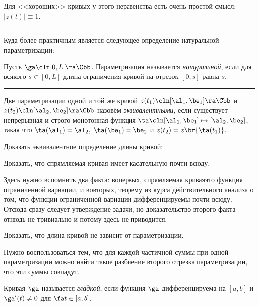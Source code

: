 \documentclass[a4paper]{article}
\newenvironment{petit}
{\par \smallskip \hrule \smallskip \footnotesize}
{\par \smallskip \hrule \smallskip}
\begin{document}
Для <<хороших>> кривых у этого неравенства есть очень простой смысл: $|\dot z(t)|\equiv 1$.

\begin{petit}
Куда более практичным является следующее определение натуральной параметризации:

\begin{df}
Пусть $\ga\cln [0,L] \ra \Cbb$. Параметризация называется \emph{натуральной}, если для всякого $s \in [0,L]$
длина ограничения кривой на отрезок $[0,s]$ равна $s$.
\end{df}
\end{petit}


\begin{df}
Две параметризации одной и той же кривой $z(t_1)\cln[\al_1,\be_1]\ra \Cbb$ и $z(t_2)\cln[\al_2,\be_2]\ra \Cbb$
назовём \emph{эквивалентными}, если существует непрерывная и строго монотонная
функция $\ta\cln [\al_1,\be_1]\mapsto [\al_2,\be_2]$, такая что $\ta(\al_1)=\al_2, \; \ta(\be_1)=\be_2$
и $z(t_2) = z\br{\ta(t_1)}$.
\end{df}

\begin{problem}
Доказать эквивалентное определение длины кривой:
\end{problem}

\begin{problem}
Доказать, что спрямляемая кривая имеет касательную почти всюду.
\end{problem}
\begin{hint}
Здесь нужно вспомнить два факта: во\д первых, спрямляемая кривая\т это функция
ограниченной вариации, и во\д вторых, теорему из курса действительного анализа
о том, что функции ограниченной вариации дифференцируемы почти всюду.
Отсюда сразу следует утверждение задачи, но доказательство второго факта
отнюдь не тривиально и потому здесь не приводится.
\end{hint}

\begin{problem}
Доказать, что длина кривой не зависит от параметризации.
\end{problem}
\begin{hint}
Нужно воспользоваться тем, что для каждой частичной суммы при одной параметризации
можно найти такое разбиение второго отрезка параметризации, что эти суммы совпадут.
\end{hint}

\begin{df}
Кривая $\ga$ называется \emph{гладкой}, если функция $\ga$ дифференцируема
на $[a,b]$ и $\ga'(t) \ne 0$ для $\fa t \in [a,b]$.
\end{df}
\end{document}
